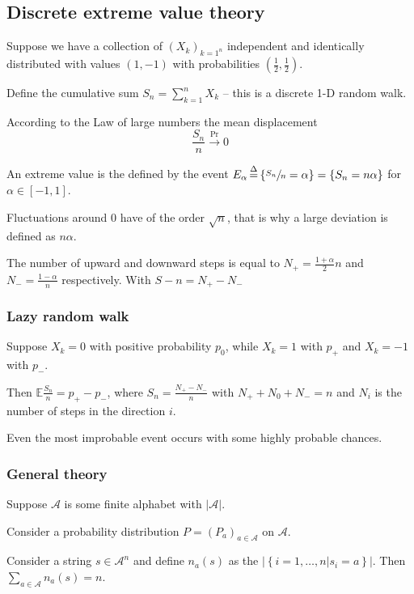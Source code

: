 \documentclass[a4paper]{article}
\newcommand{\obj}[1]{{\left\{ #1 \right \}}}
\newcommand{\clo}[1]{{\left [ #1 \right ]}}
\newcommand{\brac}[1]{{\left ( #1 \right )}}
\newcommand{\induc}[1]{{\left . #1 \right \vert}}
\newcommand{\abs}[1]{{\left | #1 \right |}}
\newcommand{\Acal}{\mathcal{A}}
\newcommand{\ex}{\mathbb{E}}
\newcommand{\defn}{\mathop{\overset{\Delta}{=}}\nolimits}
\begin{document}
\subsection{Discrete extreme value theory} %
\label{sub:discrete_extreme_value_theory}
Suppose we have a collection of $\brac{X_k}_{k=1^n}$ independent and identically distributed with values $\brac{1, -1}$ with probabilities $\brac{\frac{1}{2},\frac{1}{2}}$.

Define the cumulative sum $S_n = \sum_{k=1}^n X_k$ -- this is a discrete 1-D random walk.

According to the Law of large numbers the mean displacement 
\[\frac{S_n}{n} \overset{\Pr}{\to} 0\]

An extreme value is the defined by the event $E_\alpha \defn \obj{ \sfrac{S_n}{n} = \alpha } = \obj{ S_n = n\alpha }$ for $\alpha\in \clo{-1,1}$.

Fluctuations around $0$ have of the order $\sqrt{n}$, that is why a large deviation is defined as $n\alpha$.

The number of upward and downward steps is equal to $N_+ = \frac{1+\alpha}{2}n$ and $N_- = \frac{1-\alpha}{n}$ respectively. With $S-n = N_+-N_-$

\subsubsection{Lazy random walk} %
\label{ssub:lazy_random_walk}

Suppose $X_k = 0$ with positive probability $p_0$, while $X_k = 1$ with $p_+$ and $X_k=-1$ with $p_-$. 

Then $\ex \frac{S_n}{n} = p_+ - p_-$, where $S_n = \frac{N_+-N_-}{n}$ with $N_++N_0+N_- = n$ and $N_i$ is the number of steps in the direction $i$.

Even the most improbable event occurs with some highly probable chances.


\subsubsection{General theory} %
\label{ssub:general_theory}

Suppose $\Acal$ is some finite alphabet with $\abs{\Acal}$.

Consider a probability distribution $P = \brac{P_a}_{a\in \Acal}$ on $\Acal$.

Consider a string $s\in \Acal^n$ and define $n_a(s)$  as the $\abs{\obj{\induc{i=1,\ldots,n} s_i = a }}$. Then $\sum_{a\in\Acal} n_a(s) = n$.
\end{document}
